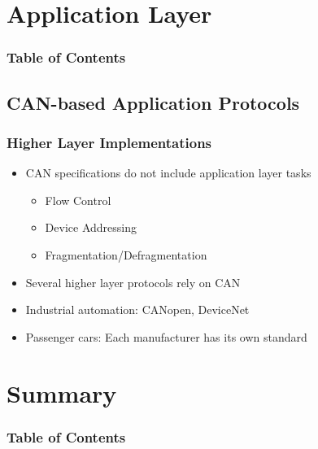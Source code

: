\documentclass{beamer}
\begin{document}
\section{Application Layer}
\begin{frame}
  \frametitle{Table of Contents}
  \tableofcontents[currentsection]
\end{frame}
\subsection{CAN-based Application Protocols}
\begin{frame}
	\frametitle{Higher Layer Implementations}
	\begin{itemize}
		\item CAN specifications do not include application layer tasks
		\begin{itemize}
			\item Flow Control
			\item Device Addressing
			\item Fragmentation/Defragmentation
		\end{itemize}
		\item Several higher layer protocols rely on CAN
		\item Industrial automation: CANopen, DeviceNet
		\item Passenger cars: Each manufacturer has its own standard
	\end{itemize}
\end{frame}

\section{Summary}
\begin{frame}
  \frametitle{Table of Contents}
  \tableofcontents[currentsection]
\end{frame}
\end{document}
